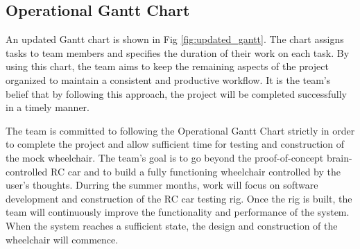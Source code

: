 \documentclass[conference]{IEEEtran}
\begin{document}
    \subsection{Operational Gantt Chart}

    An updated Gantt chart is shown in Fig \ref{fig:updated_gantt}. The chart assigns tasks to team members and specifies the duration of their work on each task. By using this chart, the team aims to keep the remaining aspects of the project organized to maintain a consistent and productive workflow. It is the team's belief that by following this approach, the project will be completed successfully in a timely manner. 

    The team is committed to following the Operational Gantt Chart strictly in order to complete the project and allow sufficient time for testing and construction of the mock wheelchair. The team's goal is to go beyond the proof-of-concept brain-controlled RC car and to build a fully functioning wheelchair controlled by the user's thoughts. Durring the summer months, work will focus on software development and construction of the RC car testing rig. Once the rig is built, the team will continuously improve the functionality and performance of the system. When the system reaches a sufficient state, the design and construction of the wheelchair will commence. 
\end{document}
